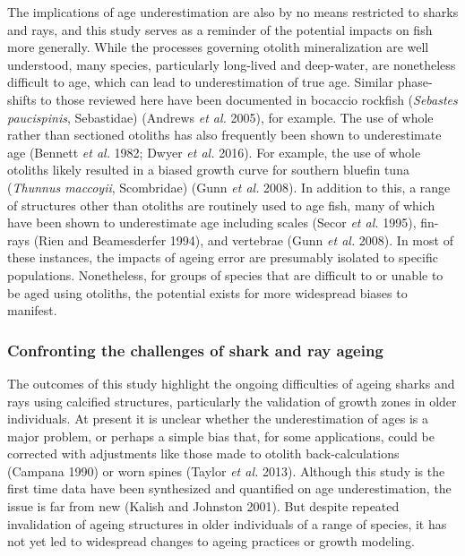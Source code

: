 \documentclass[]{article}
\begin{document}
The implications of age underestimation are also by no means restricted
to sharks and rays, and this study serves as a reminder of the potential
impacts on fish more generally. While the processes governing otolith
mineralization are well understood, many species, particularly
long-lived and deep-water, are nonetheless difficult to age, which can
lead to underestimation of true age. Similar phase-shifts to those
reviewed here have been documented in bocaccio rockfish (\emph{Sebastes
paucispinis}, Sebastidae) (Andrews \emph{et al.} 2005), for example. The
use of whole rather than sectioned otoliths has also frequently been
shown to underestimate age (Bennett \emph{et al.} 1982; Dwyer \emph{et
al.} 2016). For example, the use of whole otoliths likely resulted in a
biased growth curve for southern bluefin tuna (\emph{Thunnus maccoyii},
Scombridae) (Gunn \emph{et al.} 2008). In addition to this, a range of
structures other than otoliths are routinely used to age fish, many of
which have been shown to underestimate age including scales (Secor
\emph{et al.} 1995), fin-rays (Rien and Beamesderfer 1994), and
vertebrae (Gunn \emph{et al.} 2008). In most of these instances, the
impacts of ageing error are presumably isolated to specific populations.
Nonetheless, for groups of species that are difficult to or unable to be
aged using otoliths, the potential exists for more widespread biases to
manifest.

\subsubsection{Confronting the challenges of shark and ray
ageing}\label{confronting-the-challenges-of-shark-and-ray-ageing}

The outcomes of this study highlight the ongoing difficulties of ageing
sharks and rays using calcified structures, particularly the validation
of growth zones in older individuals. At present it is unclear whether
the underestimation of ages is a major problem, or perhaps a simple bias
that, for some applications, could be corrected with adjustments like
those made to otolith back-calculations (Campana 1990) or worn spines
(Taylor \emph{et al.} 2013). Although this study is the first time data
have been synthesized and quantified on age underestimation, the issue
is far from new (Kalish and Johnston 2001). But despite repeated
invalidation of ageing structures in older individuals of a range of
species, it has not yet led to widespread changes to ageing practices or
growth modeling.
\end{document}

